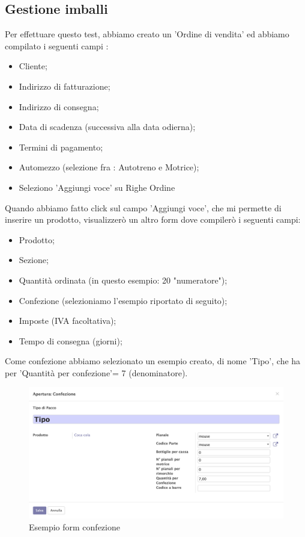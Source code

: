 \subsection{Gestione imballi}

Per effettuare questo test, abbiamo creato un 'Ordine di vendita' ed abbiamo compilato i seguenti campi :
\begin{itemize}
	\item Cliente;
	\item Indirizzo di fatturazione;
	\item Indirizzo di consegna;
	\item Data di scadenza (successiva alla data odierna);
	\item Termini di pagamento;
	\item Automezzo (selezione fra : Autotreno e Motrice);
	\item Seleziono 'Aggiungi voce' su Righe Ordine
\end{itemize}

Quando abbiamo fatto click sul campo 'Aggiungi voce', che mi permette di inserire un prodotto, visualizzerò un altro form dove compilerò i seguenti campi:
\begin{itemize}
\item Prodotto;
\item Sezione;
\item Quantità ordinata (in questo esempio: 20 "numeratore");
\item Confezione (selezioniamo l'esempio riportato di seguito);
\item Imposte (IVA facoltativa);
\item Tempo di consegna (giorni);
\end{itemize}

Come confezione abbiamo selezionato un esempio creato, di nome 'Tipo', che ha per 'Quantità per confezione'= 7 (denominatore).
\vspace*{1cm}
\begin{figure}[H]
	\begin{center} \includegraphics[scale=0.3]{figures/package}
		\caption[Esempio form confezione]{Esempio form confezione}
		\label{fig:package}
	\end{center}
\end{figure}

